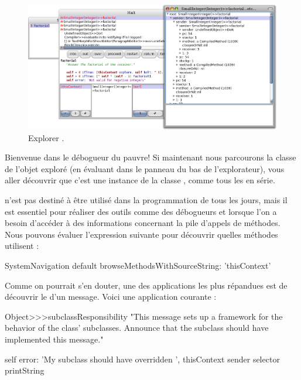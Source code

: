 \documentclass[a4paper,10pt,twoside]{book}
\begin{document}
\begin{figure}[ht]\centering
	\includegraphics[width=\linewidth]{exploringThisContext}
	\caption{Explorer .}
\end{figure}

Bienvenue dans le débogueur du pauvre! 
Si maintenant nous parcourons la classe de l'objet exploré (\ie en évaluant  dans le panneau du bas de l'explorateur), vous aller découvrir que c'est une instance de la classe , comme tous les \senders en série.

 n'est pas destiné à être utilisé dans la programmation de tous les jours, mais il est essentiel pour réaliser des outils comme des débogueurs et lorsque l'on a besoin d'accéder à des informations concernant la pile d'appels de méthodes.
Nous pouvons évaluer l'expression suivante pour découvrir quelles méthodes utilisent :

\begin{code}{}
SystemNavigation default browseMethodsWithSourceString: 'thisContext'
\end{code}

Comme on pourrait s'en douter, une des applications les plus répandues est de découvrir le \sender d'un message.
Voici une application courante :
\begin{code}{}
Object>>>subclassResponsibility
	"This message sets up a framework for the behavior of the class' subclasses.
	Announce that the subclass should have implemented this message."

	self error: 'My subclass should have overridden ', thisContext sender selector printString
\end{code}
\end{document}
